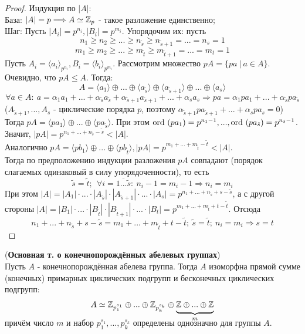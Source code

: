 \begin{proof}
    Индукция по $|A|$:\\
    База: $|A| = p \Longrightarrow A \simeq \mathbb{Z}_p$ - такое разложение единственно;\\
    Шаг: Пусть $|A_i| = p^{n_i}, |B_i| = p^{m_i}$. Упорядочим их: пусть
    \[n_1 \geqslant n_2 \geqslant ... \geqslant n_{\tilde{s}} \geqslant n_{\tilde{s}+1} = ... = n_s = 1\]
    \[m_1 \geqslant m_2 \geqslant ... \geqslant m_{\tilde{t}} \geqslant m_{\tilde{t}+1} = ... = m_t = 1\]
    Пусть $A_i = \langle a_i \rangle_{p^{n_i}}, B_i = \langle b_i \rangle_{p^{m_i}}$. Рассмотрим множество $pA = \{pa \ | \ a \in A\}$. Очевидно, что $pA \leq A$. Тогда:
    \[A = \langle a_1 \rangle \oplus ... \oplus \langle a_{\tilde{s}} \rangle \oplus \langle a_{\tilde{s} + 1} \rangle \oplus ... \oplus \langle a_{s} \rangle\]
    \[\forall a \in A: \ a = \alpha_1a_1 + ... + \alpha_{\tilde{s}}a_{\tilde{s}} + \alpha_{\tilde{s} + 1}a_{\tilde{s} + 1} + ... + \alpha_sa_s \Longrightarrow pa = \alpha_1pa_1 + ... + \alpha_{\tilde{s}}pa_{\tilde{s}}\]
    ($A_{\tilde{s}+1},..., A_s$ - циклические порядка $p$, поэтому $\alpha_{\tilde{s} + 1}pa_{\tilde{s} + 1} + ... + \alpha_spa_s = 0$)\\
    Тогда $pA = \langle pa_1 \rangle \oplus ... \oplus \langle pa_{\tilde{s}} \rangle$. При этом $\textup{ord }(pa_1) = p^{n_1 - 1}, ..., \textup{ord }(pa_{\tilde{s}}) = p^{n_{\tilde{s}} - 1}$.
    Значит, $|pA| = p^{n_1 + ... + n_{\tilde{s}} - \tilde{s}} < |A|$.\\
    Аналогично $pA = \langle pb_1 \rangle \oplus ... \oplus \langle pb_{\tilde{t}} \rangle, |pA| = p^{m_1 + ... + m_{\tilde{t}} - \tilde{t}} < |A|$.\\
    Тогда по предположению индукции разложения $pA$ совпадают (порядок слагаемых одинаковый в силу упорядоченности), то есть 
    \[\tilde{s} = \tilde{t}; \ \ \forall i = \overline{1...\tilde{s}}: \ n_i - 1 = m_i - 1 \Longrightarrow n_i = m_i\]
    При этом $|A| = |A_1|\cdot...\cdot|A_{\tilde{s}}|\cdot|A_{\tilde{s} + 1}|\cdot...\cdot|A_s| = p^{n_1 + ... + n_{\tilde{s}} + s - \tilde{s}}$, а с другой стороны $|A| = |B_1|\cdot...\cdot|B_{\tilde{t}}|\cdot|B_{\tilde{t} + 1}|\cdot...\cdot|B_t| = p^{m_1 + ... + m_{\tilde{t}} + t - \tilde{t}}$. Отсюда
    \[n_1 + ... + n_{\tilde{s}} + s - \tilde{s} = m_1 + ... + m_{\tilde{t}} + t - \tilde{t}; \ \tilde{s} = \tilde{t}; \ n_i = m_i \Longrightarrow s = t\]
\end{proof}
\begin{theorem}(\textbf{Основная т. о конечнопорождённых абелевых группах})\\
    Пусть $A$ - конечнопорождённая абелева группа. Тогда $A$ изоморфна прямой сумме (конечных) примарных циклических подгрупп и бесконечных циклических подгрупп:
    \[A \simeq \Z_{p_1^{s_1}} \oplus ... \oplus \Z_{p_k^{s_k}} \oplus \undermat{m}{\Z \oplus ... \oplus \Z}\]
    \newline
    причём число $m$ и набор $p_1^{s_1},...,p_k^{s_k}$ определены однозначно для группы $A$.
\end{theorem}
